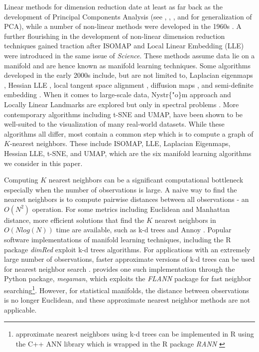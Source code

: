 \documentclass{article}
\begin{document}
Linear methods for dimension reduction date at least as far back as the
development of Principal Components Analysis (see
\citet{Johnstone2009-gf}, \citet{Li2017-ot}, \citet{Fan2019-qv}, and
\citet{Tang2021-qq} for generalization of PCA), while a number of
non-linear methods were developed in the 1960s
\citep{Shepard1962-ac, Shepard1962-ft, Kruskal1964-iv, Kruskal1964-md}.
A further flourishing in the development of non-linear dimension
reduction techniques gained traction after ISOMAP
\citep{Tenenbaum2000-fr} and Local Linear Embedding (LLE)
\citep{Roweis2000-ni} were introduced in the same issue of
\emph{Science}. These methods assume data lie on a manifold and are
hence known as manifold learning techniques. Some algorithms developed
in the early 2000s include, but are not limited to, Laplacian eigenmaps
\citep{Belkin2003-kz}, Hessian LLE \citep{Donoho2003-am}, local tangent
space alignment \citep{Zhang2003-yi}, diffusion maps
\citep{Nadler2006-cm, Coifman2006-no}, and semi-definite embedding
\citep{Weinberger2006-dc}. When it comes to large-scale data,
Nystr\{"o\}m approach and Locally Linear Landmarks are explored but only
in spectral problems
\citep{Drineas2005-zr, Talwalkar2008-fl, Vladymyrov2013-tr}. More
contemporary algorithms including t-SNE \citep{Van_der_Maaten2008-dv}
and UMAP\citep{McInnes2018-xo}, have been shown to be well-suited to the
visualization of many real-world datasets. While these algorithms all
differ, most contain a common step which is to compute a graph of
\(K\)-nearest neighbors. These include ISOMAP, LLE, Laplacian Eigenmaps,
Hessian LLE, t-SNE, and UMAP, which are the six manifold learning
algorithms we consider in this paper.

Computing \(K\) nearest neighbors can be a significant computational
bottleneck especially when the number of observations is large. A naive
way to find the nearest neighbors is to compute pairwise distances
between all observations - an \(O(N^2)\) operation. For some metrics
including Euclidean and Manhattan distance, more efficient solutions
that find the \(K\) nearest neighbors in \(O(Nlog(N))\) time are
available, such as k-d trees \citep{Bentley1975-zo} and Annoy
\citep{Bernhardsson2016-tf}. Popular software implementations of
manifold learning techniques, including the R package \emph{dimRed}
\citep{Kraemer2018-zf} exploit k-d trees algorithms. For applications
with an extremely large number of observations, faster approximate
versions of k-d trees can be used for nearest neighbor search
\citep{Van_Der_Maaten2014-in}. \citet{McQueen2016-xz} provides one such
implementation through the Python package, \emph{megaman}, which
exploits the \emph{FLANN} \citep{Muja2009-de} package for fast neighbor
searching\footnote{approximate nearest neighbors using k-d trees can be
  implemented in R using the C++ ANN library \citep{mount2010-ann} which
  is wrapped in the R package \emph{RANN} \citep{jefferislab2019-l2}}.
However, for statistical manifolds, the distance between observations is
no longer Euclidean, and these approximate nearest neighbor methods are
not applicable.
\end{document}
